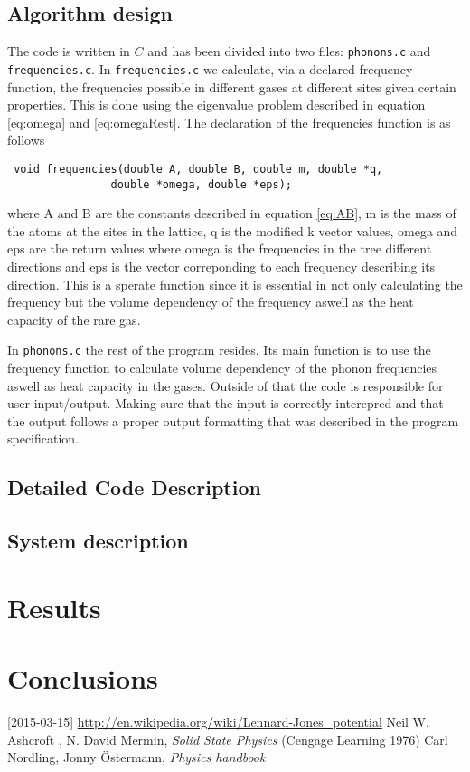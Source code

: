 \documentclass[11pt]{article}
\begin{document}
\subsection{Algorithm design}
The code is written in $C$ and has been divided into two files: \verb+phonons.c+ and \verb+frequencies.c+. In \verb+frequencies.c+ we calculate, via a declared frequency function, the frequencies possible in different gases at different sites given certain properties. This is done using the eigenvalue problem described in equation \ref{eq:omega} and \ref{eq:omegaRest}. The declaration of the frequencies function  is as follows
\begin{lstlisting}
 void frequencies(double A, double B, double m, double *q, 
				double *omega, double *eps);
\end{lstlisting}
where A and B are the constants described in equation \ref{eq:AB}, m is the mass of the atoms at the sites in the lattice, q is the modified k vector values, omega and eps are the return values where omega is the frequencies in the tree different directions and eps is the vector correponding to each frequency describing its direction. This is a sperate function since it is essential in not only calculating the frequency but the volume dependency of the frequency aswell as the heat capacity of the rare gas. 

In \verb+phonons.c+ the rest of the program resides. Its main function is to use the frequency function to calculate volume dependency of the phonon frequencies aswell as heat capacity in the gases. Outside of that the code is responsible for user input/output. Making sure that the input is correctly interepred and that the output follows a proper output formatting that was described in the program specification.
\subsection{Detailed Code Description}
\subsection{System description}

\section{Results}

\section{Conclusions}
\begin{thebibliography}{99}
 [2015-03-15] \url{http://en.wikipedia.org/wiki/Lennard-Jones_potential}
 Neil W. Ashcroft , N. David Mermin, \textit{Solid State Physics} (Cengage Learning 1976)
 Carl Nordling, Jonny Östermann, \textit{Physics handbook}
\end{thebibliography}
\end{document}
